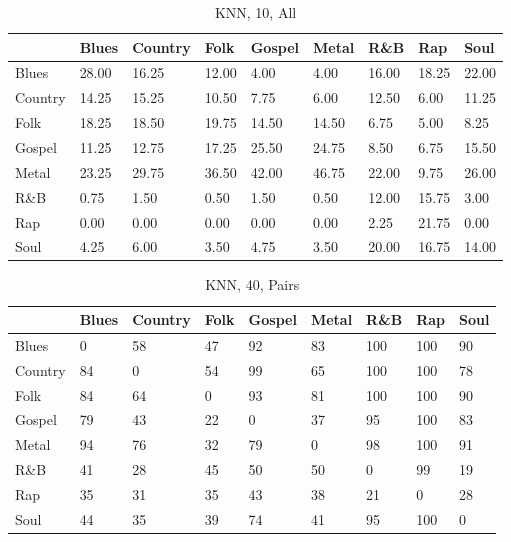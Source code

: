 \documentclass[a4paper,oneside]{article}
\begin{document}
\begin{table}[H]
\caption{KNN, 10, All}
\begin{tabu}{l|*{8}{l}}
 & Blues & Country & Folk & Gospel & Metal & R\&B & Rap & Soul \\ \hline
Blues & 28.00 & 16.25 & 12.00 & 4.00 & 4.00 & 16.00 & 18.25 & 22.00 \\
Country & 14.25 & 15.25 & 10.50 & 7.75 & 6.00 & 12.50 & 6.00 & 11.25 \\
Folk & 18.25 & 18.50 & 19.75 & 14.50 & 14.50 & 6.75 & 5.00 & 8.25 \\
Gospel & 11.25 & 12.75 & 17.25 & 25.50 & 24.75 & 8.50 & 6.75 & 15.50 \\
Metal & 23.25 & 29.75 & 36.50 & 42.00 & 46.75 & 22.00 & 9.75 & 26.00 \\
R\&B & 0.75 & 1.50 & 0.50 & 1.50 & 0.50 & 12.00 & 15.75 & 3.00 \\
Rap & 0.00 & 0.00 & 0.00 & 0.00 & 0.00 & 2.25 & 21.75 & 0.00 \\
Soul & 4.25 & 6.00 & 3.50 & 4.75 & 3.50 & 20.00 & 16.75 & 14.00 \\
\end{tabu}
\end{table}

\begin{table}[H]
\caption{KNN, 40, Pairs}
\begin{tabu}{l|*{8}{l}}
 & Blues & Country & Folk & Gospel & Metal & R\&B & Rap & Soul \\ \hline
Blues & 0 & 58 & 47 & 92 & 83 & 100 & 100 & 90 \\
Country & 84 & 0 & 54 & 99 & 65 & 100 & 100 & 78 \\
Folk & 84 & 64 & 0 & 93 & 81 & 100 & 100 & 90 \\
Gospel & 79 & 43 & 22 & 0 & 37 & 95 & 100 & 83 \\
Metal & 94 & 76 & 32 & 79 & 0 & 98 & 100 & 91 \\
R\&B & 41 & 28 & 45 & 50 & 50 & 0 & 99 & 19 \\
Rap & 35 & 31 & 35 & 43 & 38 & 21 & 0 & 28 \\
Soul & 44 & 35 & 39 & 74 & 41 & 95 & 100 & 0 \\
\end{tabu}
\end{table}
\end{document}
